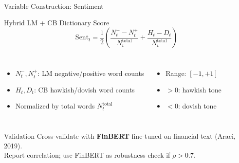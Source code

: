 \documentclass[aspectratio=169, 11pt]{beamer}
\begin{document}
\begin{frame}{Variable Construction: Sentiment}
  \begin{ablock}{Hybrid LM + CB Dictionary Score}
    \begin{equation}
      \mathrm{Sent}_t = \frac{1}{2}\!\left(
        \frac{N_t^{-} - N_t^{+}}{N_t^{\mathrm{total}}}
        + \frac{H_t - D_t}{N_t^{\mathrm{total}}}
      \right)
    \end{equation}
  \end{ablock}

  \begin{columns}[T]
    \begin{itemize}
      \item $N_t^{-}, N_t^{+}$: LM negative/positive word counts
      \item $H_t, D_t$: CB hawkish/dovish word counts
      \item Normalized by total words $N_t^{\mathrm{total}}$
    \end{itemize}

    \begin{itemize}
      \item Range: $[-1, +1]$
      \item $> 0$: hawkish tone
      \item $< 0$: dovish tone
    \end{itemize}
  \end{columns}

  \vspace{0.3em}
  \begin{aalertblock}{Validation}
    \footnotesize
    Cross-validate with \textbf{FinBERT} fine-tuned on financial text (Araci, 2019). \\
    Report correlation; use FinBERT as robustness check if $\rho > 0.7$.
  \end{aalertblock}
\end{frame}
\end{document}
